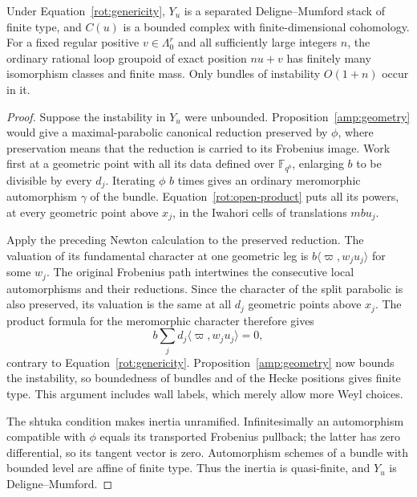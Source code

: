 \begin{lemma}\label{rot:bounded}
Under Equation~\eqref{rot:genericity}, $Y_u$ is a separated
Deligne--Mumford stack of finite type, and $C(u)$ is a bounded complex
with finite-dimensional cohomology.  For a fixed regular positive
$v\in\Lambda_0^r$ and all sufficiently large integers $n$, the ordinary
rational loop groupoid of exact position $nu+v$ has finitely many
isomorphism classes and finite mass.  Only bundles of instability
$O(1+n)$ occur in it.
\end{lemma}

\begin{proof}
Suppose the instability in $Y_u$ were unbounded.  Proposition~\ref{amp:geometry}
would give a maximal-parabolic canonical reduction preserved by $\phi$,
where preservation means that the reduction is carried to its
Frobenius image.  Work first at a geometric point with all its data
defined over $\mathbb F_{q^b}$, enlarging $b$ to be divisible by every
$d_j$.  Iterating $\phi$ $b$ times gives an ordinary meromorphic
automorphism $\gamma$ of the bundle.  Equation~\eqref{rot:open-product}
puts all its powers, at every geometric point above $x_j$, in the
Iwahori cells of translations $mbu_j$.

Apply the preceding Newton calculation to the preserved reduction.
The valuation of its fundamental character at one geometric leg is
$b\langle\varpi,w_ju_j\rangle$ for some $w_j$.  The original
Frobenius path intertwines the consecutive local automorphisms and
their reductions.  Since the character of the split parabolic is also
preserved, its valuation is the same at all $d_j$ geometric points
above $x_j$.  The product formula for the meromorphic character
therefore gives
\[
 b\sum_jd_j\langle\varpi,w_ju_j\rangle=0,
\]
contrary to Equation~\eqref{rot:genericity}.  Proposition~\ref{amp:geometry}
now bounds the instability, so boundedness of bundles and of the Hecke
positions gives finite type.  This argument includes wall labels, which
merely allow more Weyl choices.

The shtuka condition makes inertia unramified.  Infinitesimally an
automorphism compatible with $\phi$ equals its transported Frobenius
pullback; the latter has zero differential, so its tangent vector is
zero.  Automorphism schemes of a bundle with bounded level are affine
of finite type.  Thus the inertia is quasi-finite, and $Y_u$ is
Deligne--Mumford.


\end{proof}
